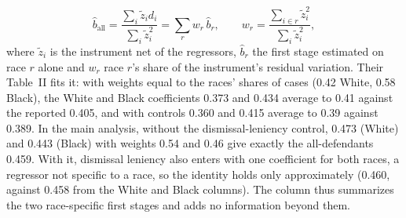 \documentclass[11pt]{article}
\begin{document}
\begin{itemize}
\begin{equation*}
\hat b_{\text{all}} = \frac{\sum_i \tilde z_i d_i}{\sum_i \tilde z_i^2} = \sum_{r} w_r\, \hat b_r, \qquad w_r = \frac{\sum_{i \in r} \tilde z_i^2}{\sum_i \tilde z_i^2},
\end{equation*}
where $\tilde z_i$ is the instrument net of the regressors, $\hat b_r$ the first stage estimated on race $r$ alone and $w_r$ race $r$'s share of the instrument's residual variation. Their Table~II fits it: with weights equal to the races' shares of cases (0.42 White, 0.58 Black), the White and Black coefficients 0.373 and 0.434 average to 0.41 against the reported 0.405, and with controls 0.360 and 0.415 average to 0.39 against 0.389. In the main analysis, without the dismissal-leniency control, 0.473 (White) and 0.443 (Black) with weights 0.54 and 0.46 give exactly the all-defendants 0.459. With it, dismissal leniency also enters with one coefficient for both races, a regressor not specific to a race, so the identity holds only approximately (0.460, against 0.458 from the White and Black columns). The column thus summarizes the two race-specific first stages and adds no information beyond them.
\end{itemize}
\end{document}
